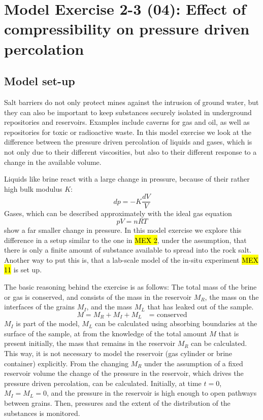 \section[MEX 2-3: Pressure driven percolation]{Model Exercise 2-3 (04): Effect of compressibility on pressure driven percolation}
\label{sec:mex04}
\subsection{Model set-up}
Salt barriers do not only protect mines against the intrusion of ground water, but they can also be important to keep substances securely isolated in underground repositories and reservoirs. Examples include caverns for gas and oil, as well as repositories for toxic or radioactive waste. In this model exercise we look at the difference between the pressure driven percolation of liquids and gases, which is not only due to their different viscosities, but also to their different response to a change in the available volume. 

Liquids like brine react with a large change in pressure, because of their rather high bulk modulus $K$:
\begin{equation}
dp = -K \frac{dV}{V}
\end{equation}
Gases, which can be described approximately with the ideal gas equation
\begin{equation}
pV=nRT
\end{equation}
show a far smaller change in pressure. In this model exercise we explore this difference in a setup similar to the one in \hl{MEX 2}, under the assumption, that there is only a finite amount of substance available to spread into the rock salt. Another way to put this is, that a lab-scale model of the in-situ experiment \hl{MEX 11} is set up. 

The basic reasoning behind the exercise is as follows: The total mass of the brine or gas is conserved, and consists of the mass in the reservoir $M_R$, the mass on the interfaces of the grains $M_I$, and the mass $M_L$ that has leaked out of the sample.
\begin{equation}
M = M_R + M_I + M_L \quad \mbox{= conserved}
\end{equation}
$M_I$ is part of the model, $M_L$ can be calculated using absorbing boundaries at the surface of the sample, at from the knowledge of the total amount $M$ that is present initially, the mass that remains in the reservoir $M_R$ can be calculated. This way, it is not necessary to model the reservoir (gas cylinder or brine container) explicitly. From the changing $M_R$ under the assumption of a fixed reservoir volume the change of the pressure in the reservoir, which drives the pressure driven percolation, can be calculated. Initially, at time $t=0$, $M_I=M_L=0$, and the pressure in the reservoir is high enough to open pathways between grains. Then, pressures and the extent of the distribution of the substances is monitored. 

